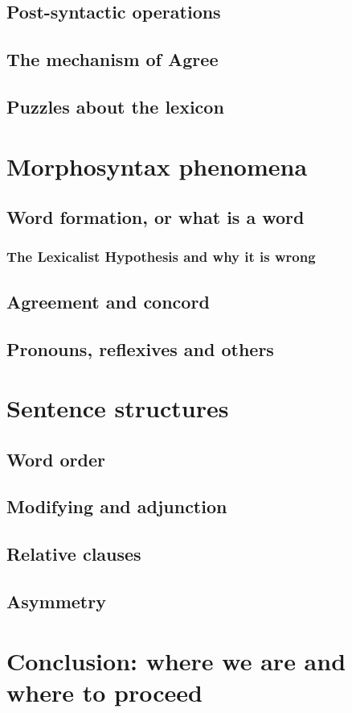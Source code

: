 \documentclass[a4paper]{article}
\begin{document}
\subsection{Post-syntactic operations}\label{sec:post-syn-op}

\subsection{The mechanism of Agree}

\subsection{Puzzles about the lexicon}

\section{Morphosyntax phenomena}

\subsection{Word formation, or what is a word}

\subsubsection{The Lexicalist Hypothesis and why it is wrong}

\subsection{Agreement and concord}

\subsection{Pronouns, reflexives and others}

\section{Sentence structures}

\subsection{Word order}

\subsection{Modifying and adjunction}

\subsection{Relative clauses}

\subsection{Asymmetry}


\section{Conclusion: where we are and where to proceed}

\end{document}

